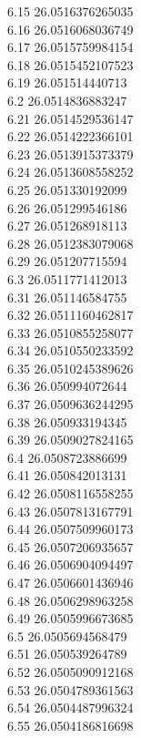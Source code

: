 {6.15	26.0516376265035\\
6.16	26.0516068036749\\
6.17	26.0515759984154\\
6.18	26.0515452107523\\
6.19	26.051514440713\\
6.2	26.0514836883247\\
6.21	26.0514529536147\\
6.22	26.0514222366101\\
6.23	26.0513915373379\\
6.24	26.0513608558252\\
6.25	26.051330192099\\
6.26	26.051299546186\\
6.27	26.051268918113\\
6.28	26.0512383079068\\
6.29	26.051207715594\\
6.3	26.0511771412013\\
6.31	26.051146584755\\
6.32	26.0511160462817\\
6.33	26.0510855258077\\
6.34	26.0510550233592\\
6.35	26.0510245389626\\
6.36	26.050994072644\\
6.37	26.0509636244295\\
6.38	26.050933194345\\
6.39	26.0509027824165\\
6.4	26.0508723886699\\
6.41	26.050842013131\\
6.42	26.0508116558255\\
6.43	26.0507813167791\\
6.44	26.0507509960173\\
6.45	26.0507206935657\\
6.46	26.0506904094497\\
6.47	26.0506601436946\\
6.48	26.0506298963258\\
6.49	26.0505996673685\\
6.5	26.0505694568479\\
6.51	26.050539264789\\
6.52	26.0505090912168\\
6.53	26.0504789361563\\
6.54	26.0504487996324\\
6.55	26.0504186816698\\
}
